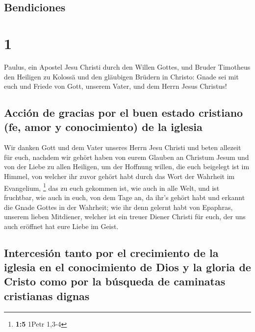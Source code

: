 \hypertarget{bendiciones}{%
\subsection{Bendiciones}\label{bendiciones}}

\hypertarget{section}{%
\section{1}\label{section}}

 Paulus, ein Apostel Jesu Christi durch den Willen Gottes,
und Bruder Timotheus  den Heiligen zu Kolossä und den
gläubigen Brüdern in Christo: Gnade sei mit euch und Friede von Gott,
unserem Vater, und dem Herrn Jesus Christus!

\hypertarget{acciuxf3n-de-gracias-por-el-buen-estado-cristiano-fe-amor-y-conocimiento-de-la-iglesia}{%
\subsection{Acción de gracias por el buen estado cristiano (fe, amor y
conocimiento) de la
iglesia}\label{acciuxf3n-de-gracias-por-el-buen-estado-cristiano-fe-amor-y-conocimiento-de-la-iglesia}}

 Wir danken Gott und dem Vater unseres Herrn Jesu Christi
und beten allezeit für euch,  nachdem wir gehört haben von
eurem Glauben an Christum Jesum und von der Liebe zu allen Heiligen,
 um der Hoffnung willen, die euch beigelegt ist im Himmel,
von welcher ihr zuvor gehört habt durch das Wort der Wahrheit im
Evangelium, \footnote{\textbf{1:5} 1Petr 1,3-4}  das zu
euch gekommen ist, wie auch in alle Welt, und ist fruchtbar, wie auch in
euch, von dem Tage an, da ihr's gehört habt und erkannt die Gnade Gottes
in der Wahrheit;  wie ihr denn gelernt habt von Epaphras,
unserem lieben Mitdiener, welcher ist ein treuer Diener Christi für
euch,  der uns auch eröffnet hat eure Liebe im Geist.

\hypertarget{intercesiuxf3n-tanto-por-el-crecimiento-de-la-iglesia-en-el-conocimiento-de-dios-y-la-gloria-de-cristo-como-por-la-buxfasqueda-de-caminatas-cristianas-dignas}{%
\subsection{Intercesión tanto por el crecimiento de la iglesia en el
conocimiento de Dios y la gloria de Cristo como por la búsqueda de
caminatas cristianas
dignas}\label{intercesiuxf3n-tanto-por-el-crecimiento-de-la-iglesia-en-el-conocimiento-de-dios-y-la-gloria-de-cristo-como-por-la-buxfasqueda-de-caminatas-cristianas-dignas}}

